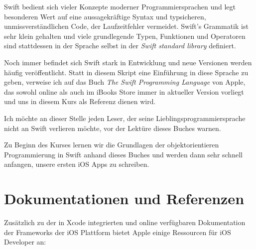 \documentclass[parskip=half, final]{scrreprt}
\begin{document}
Swift bedient sich vieler Konzepte moderner Programmiersprachen und legt besonderen Wert auf eine aussagekräftige Syntax und typsicheren, unmissverständlichen Code, der Laufzeitfehler vermeidet. Swift's Grammatik ist sehr klein gehalten und viele grundlegende Typen, Funktionen und Operatoren sind stattdessen in der Sprache selbst in der \emph{Swift standard library} definiert.

Noch immer befindet sich Swift stark in Entwicklung und neue Versionen werden häufig veröffentlicht. Statt in diesem Skript eine Einführung in diese Sprache zu geben, verweise ich auf das Buch \emph{The Swift Programming Language} von Apple, das sowohl online  als auch im iBooks Store  immer in aktueller Version vorliegt und uns in diesem Kurs als Referenz dienen wird.

Ich möchte an dieser Stelle jeden Leser, der seine Lieblingsprogrammiersprache nicht an Swift verlieren möchte, vor der Lektüre dieses Buches warnen.

Zu Beginn des Kurses lernen wir die Grundlagen der objektorientieren Programmierung in Swift anhand dieses Buches und werden dann sehr schnell anfangen, unsere ersten iOS Apps zu schreiben.


\section{Dokumentationen und Referenzen}\label{sec:docs}

Zusätzlich zu der in Xcode integrierten  und online verfügbaren Dokumentation der Frameworks der iOS Plattform bietet Apple einige Ressourcen für iOS Developer an:
\end{document}
